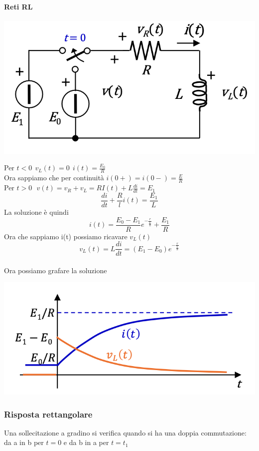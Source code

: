 \documentclass{article}
\theoremstyle{definition}
\begin{document}
\paragraph{Reti RL}
\begin{center}
\includegraphics[scale=0.35]{immagini/rlf}
\end{center}
Per $t<0 \ \ v_L(t)=0 \ \ i(t) = \frac{E_0}{R}$\\
Ora sappiamo che per continuità $i(0+)=i(0-)=\frac{E}{R}$\\
Per $t>0 \ \ \ v(t)=v_R+v_L=RI(t)+L\frac{di}{dt}=E_1$
$$\frac{di}{dt}+\frac{R}{l}i(t)=\frac{E_1}{L}$$
La soluzione è quindi 
$$i(t)=\frac{E_0-E_1}{R}e^{-\frac{r}{\frac{L}{R}}}+\frac{E_1}{R}$$
Ora che sappiamo i(t) possiamo ricavare $v_L(t)$
$$v_L(t)=L\frac{di}{dt}=(E_1-E_0)e^{-\frac{r}{\frac{L}{R}}}$$\\
Ora possiamo grafare la soluzione
\begin{center}
\includegraphics[scale=0.45]{immagini/glf}
\end{center}
\subsubsection{Risposta rettangolare}
Una sollecitazione a gradino si verifica quando si ha una doppia commutazione: da a in b per $t=0$ e da b in a per $t = t_1$
\end{document}
